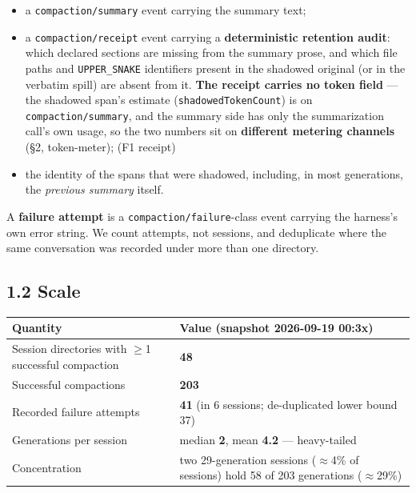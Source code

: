 \documentclass[
]{article}
\newcounter{none} %
\providecommand{\tightlist}{%
  \setlength{\itemsep}{0pt}\setlength{\parskip}{0pt}}
\begin{document}
\begin{itemize}
\tightlist
\item
  a \texttt{compaction/summary} event carrying the summary text;
\item
  a \texttt{compaction/receipt} event carrying a \textbf{deterministic
  retention audit}: which declared sections are missing from the summary
  prose, and which file paths and \texttt{UPPER\_SNAKE} identifiers
  present in the shadowed original (or in the verbatim spill) are absent
  from it. \textbf{The receipt carries no token field} --- the shadowed
  span's estimate (\texttt{shadowedTokenCount}) is on
  \texttt{compaction/summary}, and the summary side has only the
  summarization call's own usage, so the two numbers sit on
  \textbf{different metering channels} (§2, token-meter); (F1 receipt)
\item
  the identity of the spans that were shadowed, including, in most
  generations, the \emph{previous summary} itself.
\end{itemize}

A \textbf{failure attempt} is a \texttt{compaction/failure}-class event
carrying the harness's own error string. We count attempts, not
sessions, and deduplicate where the same conversation was recorded under
more than one directory.

\subsection{1.2 Scale}\label{scale}

{\def\LTcaptype{none} %
\begin{longtable}[]{@{}
  >{\raggedright\arraybackslash}p{}
  >{\raggedright\arraybackslash}p{}@{}}
\toprule\noalign{}
\begin{minipage}[b]{\linewidth}\raggedright
Quantity
\end{minipage} & \begin{minipage}[b]{\linewidth}\raggedright
Value (snapshot 2026-09-19 00:3x)
\end{minipage} \\
\midrule\noalign{}
\endhead
\bottomrule\noalign{}
\endlastfoot
Session directories with \ensuremath{\geq}1 successful compaction &
\textbf{48} \\
Successful compactions & \textbf{203} \\
Recorded failure attempts & \textbf{41} (in 6 sessions; de-duplicated
lower bound 37) \\
Generations per session & median \textbf{2}, mean \textbf{4.2} ---
heavy-tailed \\
Concentration & two 29-generation sessions (\ensuremath{\approx}4\% of
sessions) hold 58 of 203 generations (\ensuremath{\approx}29\%) \\
\end{longtable}
}
\end{document}
